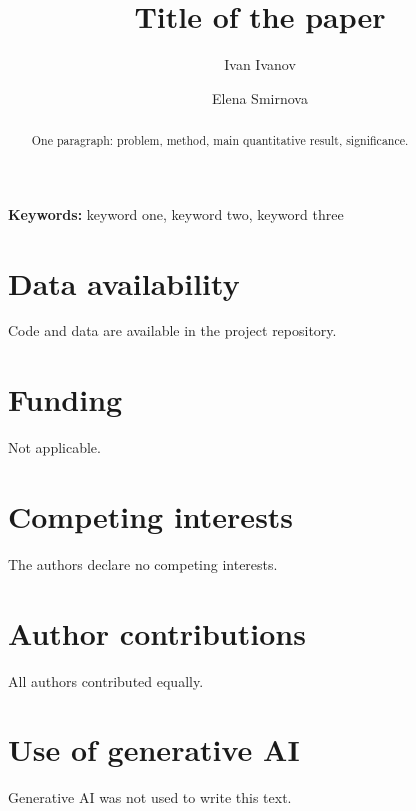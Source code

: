 \documentclass[11pt]{article}
\title{Title of the paper}
\author[1]{Ivan Ivanov}
\author[1]{Elena Smirnova}
\affil[1]{Stochastic Optimization Lab, Example University}
\newcommand{\keywords}[1]{\par\noindent\textbf{Keywords:} #1}
\begin{document}
\maketitle

\begin{abstract}
One paragraph: problem, method, main quantitative result, significance.
\end{abstract}
\keywords{keyword one, keyword two, keyword three}







\section*{Data availability}
Code and data are available in the project repository.

\section*{Funding}
Not applicable.

\section*{Competing interests}
The authors declare no competing interests.

\section*{Author contributions}
All authors contributed equally.

\section*{Use of generative AI}
Generative AI was not used to write this text.



\end{document}

